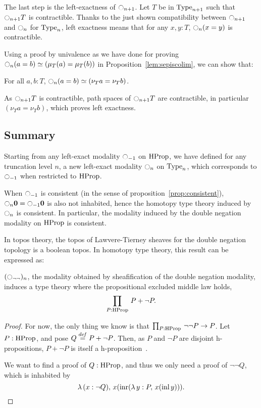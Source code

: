 The last step is the left-exactness of $\ocircle_{n+1}$. Let $T$ be in
$\operatorname{Type}_{n+1}$ such that $\ocircle_{n+1} T$ is contractible.  Thanks to the just
shown compatibility between $\ocircle_{n+1}$ and $\ocircle_n$ for
$\operatorname{Type}_n$, left exactness means that for any $x,y: T$,
$\ocircle_n(x=y)$ is contractible.

Using a proof by univalence as we have done for proving $\ocircle_n (a=b) \simeq (\mu_T(a) =
\mu_T (b))$ in Proposition~\ref{lem:sepiscolim}, we can show that:
\begin{prop}
  For all $a,b:T$, $\ocircle_n(a=b) \simeq (\nu_T a = \nu_T b)$.
\end{prop}

As $\ocircle_{n+1} T$ is contractible, path spaces of $\ocircle_{n+1} T$ are
contractible, in particular $(\nu_T a=\nu_T b)$, which proves left
exactness.

\subsection{Summary}
\label{ssec:summary}

Starting from any left-exact modality $\ocircle_{-1}$ on $\operatorname{HProp}$, we
have defined for any truncation level $n$, a new left-exact modality
$\ocircle_n$ on $\operatorname{Type}_n$, which corresponds to $\ocircle_{-1}$ when
restricted to $\operatorname{HProp}$.


When $\ocircle_{-1}$ is consistent (in the sense of
proposition~\ref{prop:consistent}), 
$\ocircle_{n}\mathbf{0}=\ocircle_{-1}\mathbf{0}$ is also not inhabited, hence the homotopy type theory induced by
$\ocircle_n$ is consistent. 
%
In particular, the modality induced by the double negation modality on
$\operatorname{HProp}$ is consistent.

In topos theory, the topos of Lawvere-Tierney sheaves for the double
negation topology is a boolean topos. In homotopy type theory, this
result can be expressed as:

\begin{prop}
  $(\ocircle_{\lnot\lnot})_n$, the modality obtained by sheafification
  of the double negation modality,
  induces a type theory where the propositional excluded middle law
  holds, \ie{}
  \[
    \prod_{P:\operatorname{HProp}}\, P + \lnot P.
  \]
\end{prop}
\begin{proof}
  For now, the only thing we know is that $\prod_{P:\operatorname{HProp}}\, \lnot\lnot
    P \to P$. Let $P:\operatorname{HProp}$, and pose $Q \overset{de\hspace{-0.2ex}f}{=} P + \lnot P$. Then, as
  $P$ and $\lnot P$ are disjoint h-propositions, $P + \lnot P$ is
  itself a h-proposition~\cite[\texttt{ishprop\_sum}]{hottlib}.

  We want to find a proof of $Q:\operatorname{HProp}$, and thus we only need a proof
  of $\lnot\lnot Q$, which is inhabited by
  \[
    \lambda\, (x:\lnot Q),\, x(\operatorname{inr} (\lambda\, y:P,\, x(\operatorname{inl} y))).
  \]
\end{proof}


